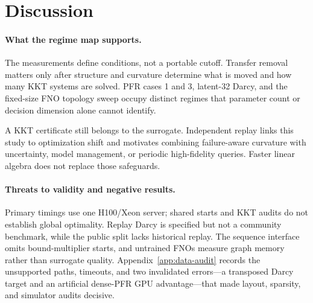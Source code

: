 \section{Discussion}
\label{sec:discussion}

\paragraph{What the regime map supports.}
The measurements define conditions, not a portable cutoff.  Transfer removal
matters only after structure and curvature determine what is moved and how many
KKT systems are solved.  PFR cases 1 and 3, latent-32 Darcy, and the fixed-size
FNO topology sweep occupy distinct regimes that parameter count or decision
dimension alone cannot identify.

A KKT certificate still belongs to the surrogate.  Independent replay links
this study to optimization shift and motivates combining failure-aware
curvature with uncertainty, model management, or periodic high-fidelity
queries.  Faster linear algebra does not replace those safeguards.

\paragraph{Threats to validity and negative results.}
Primary timings use one H100/Xeon server; shared starts and KKT audits do not
establish global optimality.  Replay Darcy is specified but not a community
benchmark, while the public split lacks historical replay.  The sequence
interface omits bound-multiplier starts, and untrained FNOs measure graph memory
rather than surrogate quality.  Appendix~\ref{app:data-audit} records the
unsupported paths, timeouts, and two invalidated errors---a transposed Darcy
target and an artificial dense-PFR GPU advantage---that made layout, sparsity,
and simulator audits decisive.
